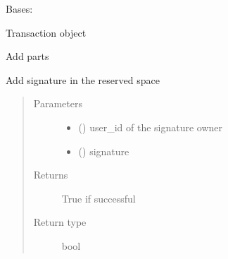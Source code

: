 \documentclass[letterpaper,10pt,english]{sphinxmanual}
\begin{document}
\begin{fulllineitems}
\label{\detokenize{bbc1.core.bbclib:bbc1.core.bbclib.BBcTransaction}}
Bases: 

Transaction object

\begin{fulllineitems}
\label{\detokenize{bbc1.core.bbclib:bbc1.core.bbclib.BBcTransaction.add}}
Add parts

\end{fulllineitems}


\begin{fulllineitems}
\label{\detokenize{bbc1.core.bbclib:bbc1.core.bbclib.BBcTransaction.add_signature}}
Add signature in the reserved space
\begin{quote}\begin{description}
\item[{Parameters}] \leavevmode\begin{itemize}
\item {} 
 () \textendash{} user\_id of the signature owner

\item {} 
 () \textendash{} signature

\end{itemize}

\item[{Returns}] \leavevmode
True if successful

\item[{Return type}] \leavevmode
bool

\end{description}\end{quote}


\end{fulllineitems}
\end{fulllineitems}
\end{document}
